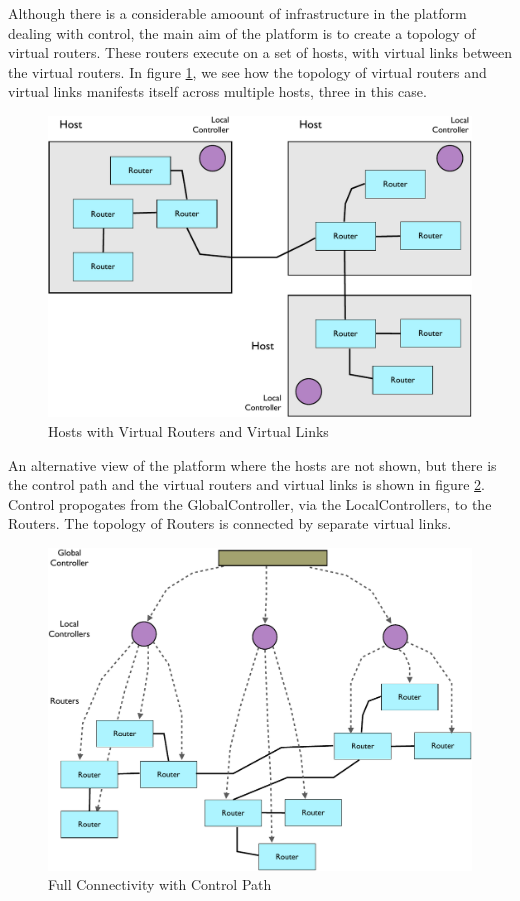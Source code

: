 Although there is a considerable amoount of infrastructure in the
platform dealing with control, the main aim of the platform is to
create a topology of virtual 
routers.  These routers execute on a set of hosts, with virtual links
between the virtual routers. 
In figure \ref{usr-hosts}, we see how the topology of virtual routers
and virtual links manifests itself across multiple hosts, three in this
case. 

\begin{figure}[h!]
    \centering
    \includegraphics[width=13cm]{images/hosts}
    \caption{Hosts with Virtual Routers and Virtual Links}
    \label{usr-hosts}
\end{figure}

An alternative view of the platform where the hosts are not shown, but
there is the control path and the virtual routers and virtual links is
shown in figure \ref{usr-control}.
Control propogates from the GlobalController, via the
LocalControllers, to the Routers.
The topology of Routers is connected by separate virtual links.

\begin{figure}[h!]
    \centering
    \includegraphics[width=13cm]{images/control-path}
    \caption{Full Connectivity with Control Path}
    \label{usr-control}
\end{figure}


